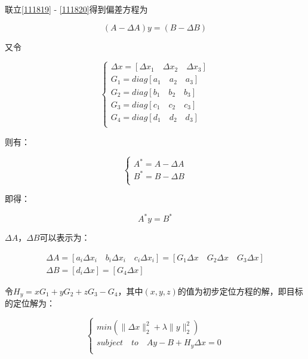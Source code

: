 联立\ref{111819} - \ref{111820}得到偏差方程为

\begin{equation}
    (A-\Delta A)y=(B-\Delta B)
\end{equation}

又令

\begin{equation}
    \begin{cases}
        \Delta x = \left[\Delta x_1 \quad \Delta x_2 \quad \Delta x_3\right]    \\
        G_1 = diag\left[a_1 \quad a_2 \quad a_3\right]  \\
        G_2 = diag\left[b_1 \quad b_2 \quad b_3\right]  \\
        G_3 = diag\left[c_1 \quad c_2 \quad c_3\right]  \\
        G_4 = diag\left[d_1 \quad d_2 \quad d_3\right]  \\
    \end{cases}
\end{equation}

则有：

\begin{equation}
    \begin{cases}
        A^* = A - \Delta A  \\
        B^* = B - \Delta B  \\
    \end{cases}
\end{equation}

即得：

\begin{equation}
    A^*y = B^*
\end{equation}

$\Delta A$，$\Delta B$可以表示为：

\begin{equation}
    \begin{aligned}
        \Delta A = \left[a_i\Delta x_i \quad b_i\Delta x_i \quad c_i\Delta x_i\right] = \left[G_1\Delta x \quad G_2\Delta x \quad G_3\Delta x\right]    \\
        \Delta B = \left[d_i\Delta x\right] = \left[G_4 \Delta x\right]
    \end{aligned}
\end{equation}

令$H_y = xG_1+yG_2+zG_3-G_4$，其中$(x,y,z)$的值为初步定位方程的解，即目标的定位解为：

\begin{equation}
    \begin{cases}
        min\left(\|\Delta x\|_2^2 + \lambda\|y\|_2^2 \right)    \\
        subject \quad to \quad Ay-B+H_y\Delta x = 0 \\
    \end{cases}
\end{equation}

